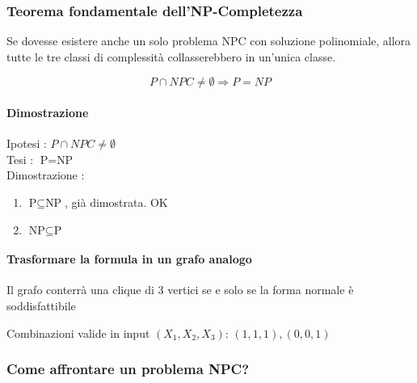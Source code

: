 
\subsubsection{Teorema fondamentale dell'NP-Completezza}

Se dovesse esistere anche un solo problema NPC con soluzione polinomiale, allora tutte le tre classi di complessità collasserebbero in un'unica classe.

\begin{equation}
P \cap NPC \neq \emptyset \Rightarrow P = NP
\end{equation}

\paragraph{Dimostrazione}

Ipotesi : $P \cap NPC \neq \emptyset$ \\
Tesi : $\text{P} = \text{NP}$ \\

Dimostrazione : 

\begin{enumerate}
\item $\text{P} \subseteq \text{NP}$, già dimostrata. OK
\item $\text{NP} \subseteq \text{P}$
\end{enumerate}





\paragraph{Trasformare la formula in un grafo analogo}

\begin{figure}
 \centering 

\end{figure}

Il grafo conterrà una clique di 3 vertici se e solo se la forma normale è soddisfattibile

Combinazioni valide in input $(X_1,X_2,X_3)$: $(1,1,1), (0,0,1)$


\subsubsection{Come affrontare un problema NPC?}

